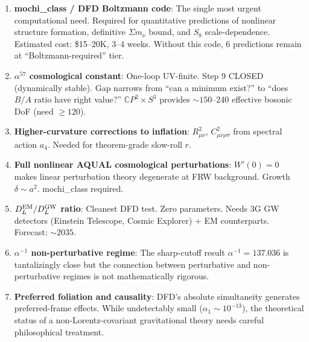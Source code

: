 \documentclass[11pt,a4paper]{article}
\newcommand{\CP}{\mathbb{C}P}
\begin{document}
\begin{enumerate}
\item \textbf{mochi\_class / DFD Boltzmann code}: The single most urgent computational need. Required for quantitative predictions of nonlinear structure formation, definitive $\Sigma m_\nu$ bound, and $S_8$ scale-dependence. Estimated cost: \$15--20K, 3--4 weeks. Without this code, 6 predictions remain at ``Boltzmann-required'' tier.

\item \textbf{$\alpha^{57}$ cosmological constant}: One-loop UV-finite. Step 9 CLOSED (dynamically stable). Gap narrows from ``can a minimum exist?'' to ``does $B/A$ ratio have right value?'' $\CP^2 \times S^3$ provides $\sim 150$--240 effective bosonic DoF (need $\geq 120$).

\item \textbf{Higher-curvature corrections to inflation}: $R_{\mu\nu}^2$, $C_{\mu\nu\rho\sigma}^2$ from spectral action $a_4$. Needed for theorem-grade slow-roll $r$.

\item \textbf{Full nonlinear AQUAL cosmological perturbations}: $W'(0) = 0$ makes linear perturbation theory degenerate at FRW background. Growth $\delta \sim a^2$. mochi\_class required.

\item \textbf{$D_L^{\rm EM}/D_L^{\rm GW}$ ratio}: Cleanest DFD test. Zero parameters. Needs 3G GW detectors (Einstein Telescope, Cosmic Explorer) + EM counterparts. Forecast: $\sim 2035$.

\item \textbf{$\alpha^{-1}$ non-perturbative regime}: The sharp-cutoff result $\alpha^{-1} = 137.036$ is tantalizingly close but the connection between perturbative and non-perturbative regimes is not mathematically rigorous.

\item \textbf{Preferred foliation and causality}: DFD's absolute simultaneity generates preferred-frame effects. While undetectably small ($\alpha_1 \sim 10^{-13}$), the theoretical status of a non-Lorentz-covariant gravitational theory needs careful philosophical treatment.
\end{enumerate}
\end{document}
